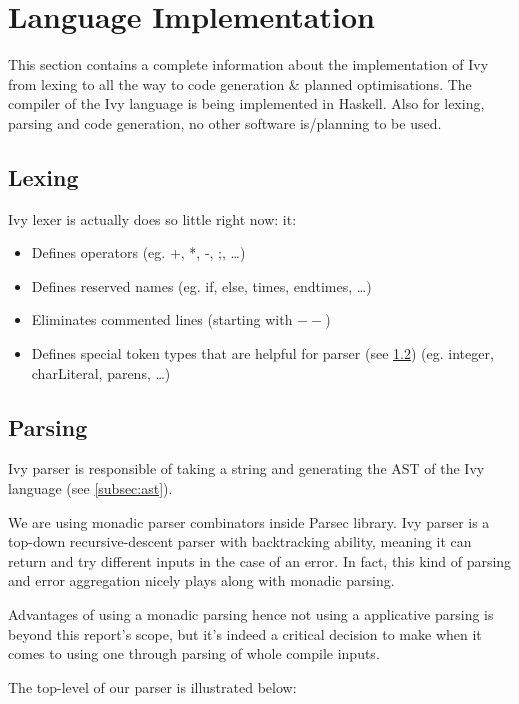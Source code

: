\documentclass{article}
\begin{document}
\section{Language Implementation}
This section contains a complete information about the implementation of Ivy from lexing to all the way to code generation \& planned optimisations.
The compiler of the Ivy language is being implemented in Haskell. Also for lexing, parsing and code generation, no other software is/planning to be used.
\subsection{Lexing}
\label{subsec:lexing}
Ivy lexer is actually does so little right now: it:
\begin{itemize}
  \item Defines operators (eg. +, *, -, ;, \ldots)
  \item Defines reserved names (eg. if, else, times, endtimes, \ldots)
  \item Eliminates commented lines (starting with $--$)
  \item Defines special token types that are helpful for parser (see \ref{subsec:parsing}) (eg. integer, charLiteral, parens, \ldots)
\end{itemize}
\subsection{Parsing}
\label{subsec:parsing}
Ivy parser is responsible of taking a string and generating the AST of the Ivy language (see \ref{subsec:ast}).
\par We are using monadic parser combinators inside Parsec library. Ivy parser is a top-down recursive-descent parser with backtracking ability, meaning it can return and try different inputs in the case of an error. In fact, this kind of parsing and error aggregation nicely plays along with monadic parsing.
\par Advantages of using a monadic parsing hence not using a applicative parsing is beyond this report's scope, but it's indeed a critical decision to make when it comes to using one through parsing of whole compile inputs.
\par The top-level of our parser is illustrated below:

\end{document}
